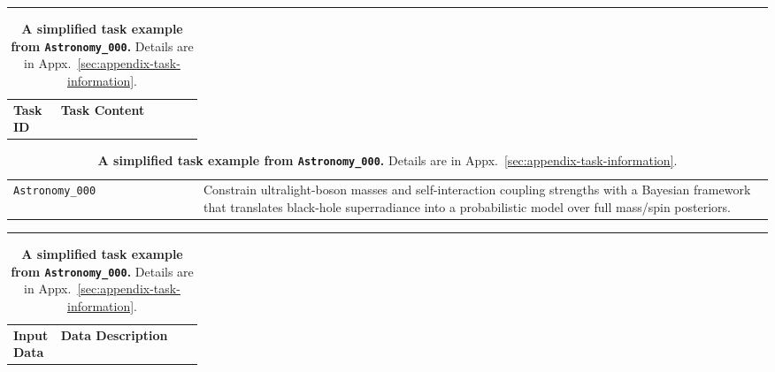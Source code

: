 \begin{table}[h]
\centering
\caption{\textbf{A simplified task example from \texttt{Astronomy\_000}.} Details are in Appx.~\ref{sec:appendix-task-information}.}
\vspace{-0.8em}
\label{tab:astronomy-task-example}
\begingroup
\scriptsize
\setlength{\tabcolsep}{3pt}
\renewcommand{\arraystretch}{1.12}
\newcommand{\RcbDashedRule}{\makebox[\linewidth][s]{\leaders\hbox{\rule[0.55ex]{5pt}{0.35pt}\hskip2.5pt}\hfill\kern0pt}}
\newcommand{\RcbSolidRule}{\noindent\rule{\linewidth}{0.45pt}\par\nointerlineskip}
\newcommand{\RcbHeaderBlock}[1]{%
  \RcbSolidRule
  \begingroup\setlength{\fboxsep}{0pt}%
  \noindent\colorbox{RcbHighlightPurple}{%
    \parbox{\linewidth}{#1\par\vspace{-0.35ex}\RcbDashedRule\par\vspace{-0.7ex}}}%
  \endgroup\par\nointerlineskip}
\newcommand{\RcbHeaderTwo}[2]{%
  \RcbHeaderBlock{%
    \begin{tabularx}{\linewidth}{@{}>{\raggedright\arraybackslash}p{0.25\linewidth}>{\raggedright\arraybackslash}X@{}}
    \textbf{#1} & \textbf{#2}
    \end{tabularx}}}
\newcommand{\RcbHeaderOne}[1]{%
  \RcbHeaderBlock{%
    \begin{tabularx}{\linewidth}{@{}>{\raggedright\arraybackslash}X@{}}
    \textbf{#1}
    \end{tabularx}}}
\newcommand{\RcbHeaderRubrics}{%
  \RcbHeaderBlock{%
    \begin{tabularx}{\linewidth}{@{}>{\raggedright\arraybackslash}X>{\centering\arraybackslash}p{0.10\linewidth}@{}}
    \textbf{Rubrics Content} & \textbf{Weight}
    \end{tabularx}}}
\RcbHeaderTwo{Task ID}{Task Content}
\begin{tabular}{@{}>{\raggedright\arraybackslash}m{0.25\linewidth}>{\raggedright\arraybackslash}m{0.75\linewidth}@{}}
\texttt{Astronomy\_000} &
Constrain ultralight-boson masses and self-interaction coupling strengths with a Bayesian framework that translates black-hole superradiance into a probabilistic model over full mass/spin posteriors. \\
\end{tabular}\par\nointerlineskip
\RcbHeaderTwo{Input Data}{Data Description}

\end{table}
